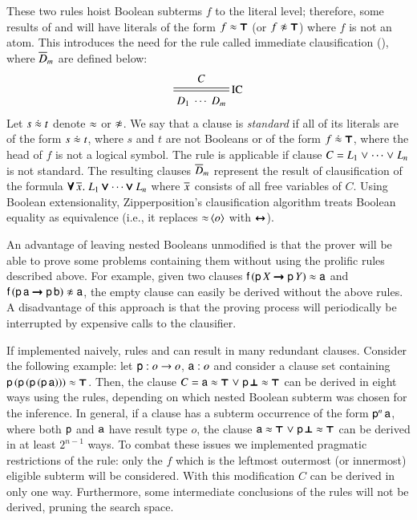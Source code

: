 \newcommand{\eqneq}{\mathrel{\dot{\eq}}}
These two rules hoist Boolean subterms $f$ to the literal level; therefore,
some results of  and  will have literals of the form $f \approx \pmb{\top}$ (or
$f \noteq \itrue$) where $f$ is not an atom. This introduces the need for the rule
called immediate clausification (), where $\overline{D}_{m}$ are defined below:
%
$$ \namedsimp{IC}{C}{D_1 \; \cdots \; D_m} $$
%
Let $s \eqneq t$ denote $\approx$ or $\not\approx$.
We say that a clause is \emph{standard} if all of its literals are of the form $s \eqneq t$,
where $s$ and $t$ are not Booleans or of the form $f \eqneq \itrue$, where the head of $f$
is not a logical symbol. The rule 
is applicable if clause $C = L_1 \mathrel\lor
\cdots \mathrel\lor L_n$ is not standard.
The resulting clauses $\overline{D}_{m}$ represent
the result of clausification of the formula $\pmb{\forall}\,\overline{x}_{}. \; L_1 \pmb{\lor}
\cdots \pmb{\lor} L_n$ where $\overline{x}_{}$ consists of all free variables of $C$.
Using Boolean extensionality, Zipperposition's clausification
algorithm treats Boolean equality as equivalence (i.e., it replaces
$\mathop{\approx}{\langle o\rangle}$ with $\pmb{\leftrightarrow}$).

An advantage of leaving nested Booleans unmodified is that the prover will be able
to prove some problems containing them without using the prolific rules described
above. For example, given two clauses $\mathsf{f} \, (\mathsf{p} \, X
\pmb{\rightarrow} \mathsf{p} \, Y) \approx \mathsf{a}$ and $\cst{f} \, (\cst{p} \,
\cst{a} \iimplies \cst{p} \, \cst{b}) \noteq \cst{a}$, the empty clause can
easily be derived without the above rules. A disadvantage of this approach
is that the proving process will periodically be interrupted by expensive calls
to the clausifier.
\pagebreak[2]

If implemented naively, rules  and  can result
in many redundant clauses. Consider the following example: let $\mathsf{p} : o
\rightarrow o$, $\mathsf{a} : o$ and consider a clause set containing $\mathsf{p} \,
(\mathsf{p} \, (\mathsf{p} \, (\mathsf{p} \, \mathsf{a}))) \approx \pmb{\top}$. Then, the clause $C
= \mathsf{a} \approx \pmb{\top} \mathrel\lor \mathsf{p} \, \pmb{\bot} \approx \pmb{\top}$ can be derived in
eight ways using the rules, depending on which nested Boolean subterm was chosen
for the inference. In general, if a clause has a subterm occurrence of the form
$\mathsf{p}^n \, \mathsf{a}$, where both $\mathsf{p}$ and $\mathsf{a}$ have result type $o$,
the clause $\mathsf{a} \approx \pmb{\top} \mathrel\lor \mathsf{p} \, \pmb{\bot} \approx \pmb{\top}$ can be
derived in at least $2^{n-1}$ ways.
To combat these issues we
implemented pragmatic restrictions of the rule: only the $f$ which is
the leftmost outermost (or innermost) eligible subterm will be considered. With
this modification $C$ can be derived in only one way. Furthermore,
some intermediate conclusions of the rules will not be derived, pruning the search space.


